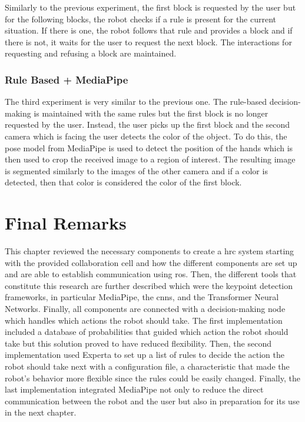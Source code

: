 Similarly to the previous experiment, the first block is requested by the user but for the following blocks, the robot checks if a rule is present for the current situation. If there is one, the robot follows that rule and provides a block and if there is not, it waits for the user to request the next block. The interactions for requesting and refusing a block are maintained.

\subsubsection{Rule Based + MediaPipe}

The third experiment is very similar to the previous one. The rule-based decision-making is maintained with the same rules but the first block is no longer requested by the user. Instead, the user picks up the first block and the second camera which is facing the user detects the color of the object. To do this, the pose model from MediaPipe is used to detect the position of the hands which is then used to crop the received image to a region of interest. The resulting image is segmented similarly to the images of the other camera and if a color is detected, then that color is considered the color of the first block.

\section{Final Remarks}
\label{section:materials_methods_final_remarks}

This chapter reviewed the necessary components to create a \acf{hrc} system starting with the provided collaboration cell and how the different components are set up and are able to establish communication using \acs{ros}. Then, the different tools that constitute this research are further described which were the keypoint detection frameworks, in particular MediaPipe, the \acfp{cnn}, and the Transformer Neural Networks. Finally, all components are connected with a decision-making node which handles which actions the robot should take. The first implementation included a database of probabilities that guided which action the robot should take but this solution proved to have reduced flexibility. Then, the second implementation used Experta to set up a list of rules to decide the action the robot should take next with a configuration file, a characteristic that made the robot's behavior more flexible since the rules could be easily changed. Finally, the last implementation integrated MediaPipe not only to reduce the direct communication between the robot and the user but also in preparation for its use in the next chapter.
